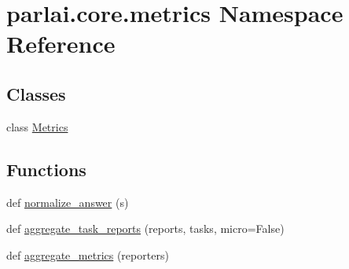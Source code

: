 \hypertarget{namespaceparlai_1_1core_1_1metrics}{}\section{parlai.\+core.\+metrics Namespace Reference}
\label{namespaceparlai_1_1core_1_1metrics}
\subsection*{Classes}
\begin{DoxyCompactItemize}
\item 
class \hyperlink{classparlai_1_1core_1_1metrics_1_1Metrics}{Metrics}
\end{DoxyCompactItemize}
\subsection*{Functions}
\begin{DoxyCompactItemize}
\item 
def \hyperlink{namespaceparlai_1_1core_1_1metrics_ae7769a6b628f41081e0f43043d52031a}{normalize\+\_\+answer} (s)
\item 
def \hyperlink{namespaceparlai_1_1core_1_1metrics_ae323045c05ed03d93c260521ebb8bf71}{aggregate\+\_\+task\+\_\+reports} (reports, tasks, micro=False)
\item 
def \hyperlink{namespaceparlai_1_1core_1_1metrics_aa4ed5491962e06684b235fffe1b20fec}{aggregate\+\_\+metrics} (reporters)
\end{DoxyCompactItemize}
